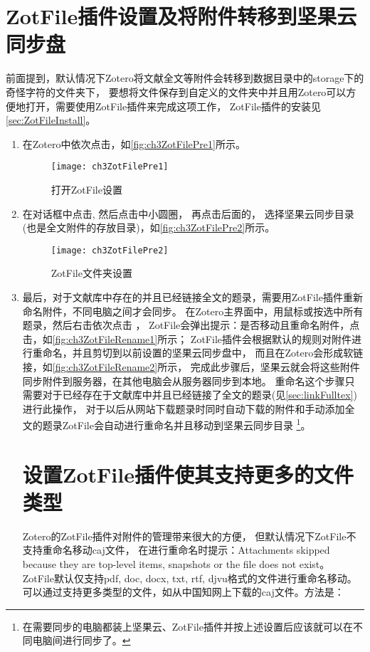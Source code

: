 \documentclass[cn,11pt,chinese]{elegantbook}
\begin{document}
	\section{ZotFile插件设置及将附件转移到坚果云同步盘}\label{sec:zotFilePre}
		前面提到，默认情况下Zotero将文献全文等附件会转移到数据目录中的storage下的奇怪字符的文件夹下，
		要想将文件保存到自定义的文件夹中并且用Zotero可以方便地打开，需要使用ZotFile插件来完成这项工作，
		ZotFile插件的安装见\cref{sec:ZotFileInstall}。
		\begin{enumerate}
			\item 在Zotero中依次点击，如\autoref{fig:ch3ZotFilePre1}所示。
			\begin{figure}[t]
				\centering
				\texttt{[image: ch3ZotFilePre1]}
				\caption{打开ZotFile设置}
				\label{fig:ch3ZotFilePre1}
			\end{figure}
			\item 在对话框中点击,
			然后点击中小圆圈，
			再点击后面的，
			选择坚果云同步目录(也是全文附件的存放目录)，如\autoref{fig:ch3ZotFilePre2}所示。
			\begin{figure}[htbp]
				\centering
				\texttt{[image: ch3ZotFilePre2]}
				\caption{ZotFile文件夹设置}
				\label{fig:ch3ZotFilePre2}
			\end{figure}
			\item 最后，对于文献库中存在的并且已经链接全文的题录，需要用ZotFile插件重新命名附件，不同电脑之间才会同步。
			在Zotero主界面中，用鼠标或按选中所有题录，然后右击依次点击
			，
			ZotFile会弹出提示：是否移动且重命名附件，点击，如\autoref{fig:ch3ZotFileRename1}所示；
			ZotFile插件会根据默认的规则对附件进行重命名，并且剪切到以前设置的坚果云同步盘中，
			而且在Zotero会形成软链接，如\autoref{fig:ch3ZotFileRename2}所示，
			完成此步骤后，坚果云就会将这些附件同步附件到服务器，在其他电脑会从服务器同步到本地。
			重命名这个步骤只需要对于已经存在于文献库中并且已经链接了全文的题录(见\cref{sec:linkFulltex})进行此操作，
			对于以后从网站下载题录时同时自动下载的附件和手动添加全文的题录ZotFile会自动进行重命名并且移动到坚果云同步目录
			\footnote{在需要同步的电脑都装上坚果云、ZotFile插件并按上述设置后应该就可以在不同电脑间进行同步了。}。
	


	\section{设置ZotFile插件使其支持更多的文件类型}\label{sec:zotFile_more_filetype}
	    \quad \quad Zotero的ZotFile插件对附件的管理带来很大的方便，
		但默认情况下ZotFile不支持重命名移动caj文件，
		在进行重命名时提示：Attachments skipped because they are top-level items, 
		snapshots or the file does not exist。
		ZotFile默认仅支持pdf, doc, docx, txt, rtf, djvu格式的文件进行重命名移动。
		可以通过支持更多类型的文件，如从中国知网上下载的caj文件。方法是：


\end{enumerate}
\end{document}
